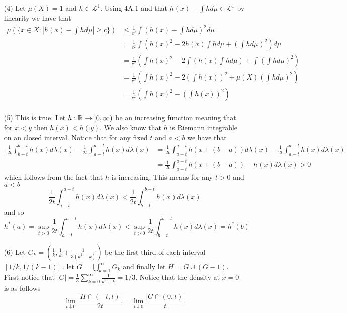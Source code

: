 \documentclass[12pt]{amsart}
\begin{document}
\begin{itemize}
\begin{enumerate}[label= (\alph*)]
   \end{enumerate}

   \item[(4)] Let $\mu(X)=1$ and $h\in\mathcal L^1$. Using 4A.1 and that 
   $h(x)-\int hd\mu\in\mathcal L^1$ by linearity we have that
   \begin{align*}\mu(\{x\in X:|h(x)-\int h d\mu|\geq c\})&\leq\frac{1}{c^2}\int\left(h(x)-\int hd\mu\right)^2d\mu\\
   &=\frac{1}{c^2}\int \left(h(x)^2-2h(x)\int hd\mu+\left(\int hd\mu\right)^2\right)d\mu\\
   &=\frac{1}{c^2}\left(\int h(x)^2-2\int \left(h(x)\int hd\mu\right)+\int\left(\int hd\mu\right)^2\right)\\
   &=\frac{1}{c^2}\left(\int h(x)^2-2\left(\int h(x)\right)^2+\mu(X)\left(\int hd\mu\right)^2\right)\\
   &=\frac{1}{c^2}\left(\int h(x)^2-\left(\int h(x)\right)^2\right)\\
   \end{align*}

   \item[(5)] This is true. Let $h:\mathbb{R}\rightarrow[0,\infty)$ be an increasing function meaning 
   that for $x<y$ then $h(x)<h(y)$. We also know that $h$ is Riemann integrable 
   on an closed interval. Notice that for any fixed $t$ and $a<b$ we have that
   \begin{align*}
      \frac{1}{2t}\int_{b-t}^{b-t}h(x)d\lambda(x)-\frac{1}{2t}\int_{a-t}^{a-t}h(x)d\lambda(x)&=
   \frac{1}{2t}\int_{a-t}^{a-t}h(x+(b-a))d\lambda(x)-\frac{1}{2t}\int_{a-t}^{a-t}h(x)d\lambda(x)
   \\&= \frac{1}{2t}\int_{a-t}^{a-t}h(x+(b-a))-h(x)d\lambda(x)>0
   \end{align*}
   which follows from the fact that $h$ is increasing. This means for any $t>0$ and $a<b$
   \[\frac{1}{2t}\int_{a-t}^{a-t}h(x)d\lambda(x)<\frac{1}{2t}\int_{b-t}^{b-t}h(x)d\lambda(x)\]
   and so 
   \[h^*(a)=\sup_{t>0}\frac{1}{2t}\int_{a-t}^{a-t}h(x)d\lambda(x)<\sup_{t>0}\frac{1}{2t}\int_{b-t}^{b-t}h(x)d\lambda(x)=h^*(b)\]

   \item[(6)] %
   Let $G_k=(\frac{1}{k},\frac{1}{k}+\frac{1}{3(k^2-k)})$ be the first third of each interval 
   $[1/k,1/(k-1)]$. let $G=\bigcup_{k=1}^{\infty}G_k$ and finally let $H=G\cup(G-1)$.
   First notice that $|G|=\frac{1}{3}\sum_{k=0}^\infty\frac{1}{k^2-k}=1/3$.
   Notice that the density at $x=0$ is as follows
   \[\lim_{t\downarrow 0}\frac{|H\cap (-t,t)|}{2t}=\lim_{t\downarrow 0}\frac{|G\cap (0,t)|}{t}\]
   

\end{itemize}
\end{document}
